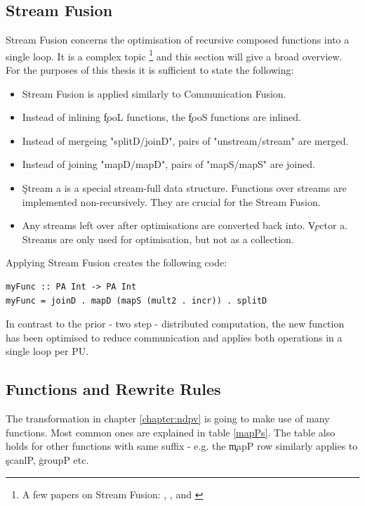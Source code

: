   \subsection{Stream Fusion}
    Stream Fusion concerns the optimisation of recursive composed functions
    into a single loop. It is a complex topic
    \footnote{A few papers on Stream Fusion:
    \cite{GenVectorFusion2013}, \cite{Fusion2007},
    \cite{ArrayFusion2001Chakravarty}
    and \cite{CostArray2002Leshchinskiy}
    } and this section will give a broad overview.
    For the purposes of this thesis it is sufficient to state the following:
    \begin{itemize}
      \item Stream Fusion is applied similarly to Communication Fusion.
      \item Instead of inlining \c{fooL} functions, the \c{fooS} functions are inlined.
      \item Instead of mergeing "splitD/joinD", pairs of "unstream/stream" are merged.
      \item Instead of joining "mapD/mapD", pairs of "mapS/mapS" are joined.
      \item \c{Stream a} is a special stream-full data structure.
        Functions over streams are implemented non-recursively.
        They are crucial for the Stream Fusion.
      \item Any streams left over after optimisations are converted back into.
        \c{Vector a}. Streams are only used for optimisation, but not as a collection.
    \end{itemize}
    Applying Stream Fusion creates the following code:
    \begin{lstlisting}
myFunc :: PA Int -> PA Int
myFunc = joinD . mapD (mapS (mult2 . incr)) . splitD
    \end{lstlisting}
    In contrast to the prior - two step - distributed computation,
    the new function has been optimised to reduce communication
    and applies both operations in a single loop per PU.
    
  \subsection*{Functions and Rewrite Rules}
    The transformation in chapter \ref{chapter:ndpv} is going to
    make use of many functions. Most common ones are explained in table \ref{mapPs}.
    The table also holds for other functions with same suffix - e.g.
    the \c{mapP} row similarly applies to \c{scanlP}, \c{groupP} etc.
    
